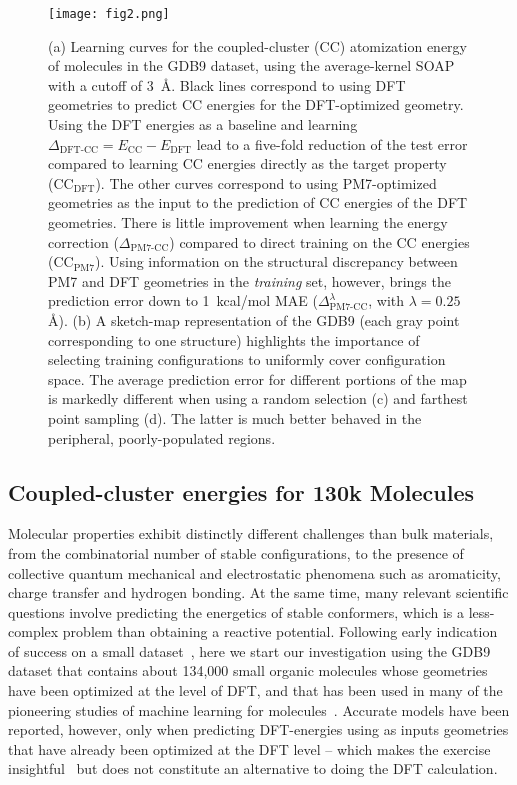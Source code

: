 \documentclass[12pt]{article}
\begin{document}
\begin{figure*}[hbtp]
\centering\texttt{[image: fig2.png]}
\caption{%
(a) Learning curves for the coupled-cluster (CC) atomization energy of molecules in the
GDB9 dataset, using the average-kernel SOAP with a cutoff of 3~\AA{}.
%
%
Black lines correspond to using DFT geometries to predict CC energies for the DFT-optimized geometry.
Using  the DFT energies as a baseline and learning
$\Delta_\text{DFT-CC}=E_\text{CC}-E_\text{DFT}$ lead to a five-fold 
reduction of the test error compared to learning CC energies directly 
as the target property (CC$_\text{DFT}$). 
%
%
%
The other curves correspond to using  PM7-optimized 
geometries as the input to the prediction of CC energies 
of the DFT geometries. There is little improvement when 
learning the energy correction ($\Delta_\text{PM7-CC}$) 
compared to direct training on the CC energies (CC$_\text{PM7}$). 
Using information on the structural 
discrepancy between PM7 and DFT geometries in the \emph{training} set, 
however, brings the prediction error down to 1~kcal/mol MAE ($\Delta^\lambda_\text{PM7-CC}$, with $\lambda=0.25$\AA).
%
%
(b) A sketch-map representation of the GDB9 (each gray point corresponding to one structure) highlights the importance of 
selecting training configurations to uniformly cover configuration space. The average prediction error for different portions of the map is markedly different when using a random selection (c) and farthest point sampling (d). The latter is much better behaved in the peripheral, poorly-populated regions. 
}
\label{fig:gdb9}
\end{figure*}


\subsection{Coupled-cluster energies for 130k Molecules }

%
Molecular properties exhibit distinctly different 
challenges than bulk materials, from 
the combinatorial number of stable configurations, 
to the presence of collective quantum mechanical
and electrostatic phenomena such as aromaticity, 
charge transfer and hydrogen bonding. At the 
same time, many relevant scientific questions 
involve predicting the energetics of stable
conformers, which is a less-complex problem than
obtaining a reactive potential.
Following early indication of success on a small 
dataset~\cite{mont+13njp,de+16pccp},
here we start our investigation using the GDB9 dataset
that contains about 134,000 small organic molecules 
%
whose geometries have been optimized at the level
of DFT, and that 
has been used in many of the 
pioneering studies of machine learning
for molecules~\cite{rama+14sd,rama+15jctc}. Accurate
models have been reported, however, only when
predicting DFT-energies using as inputs geometries
that have already been optimized at the DFT level
 --
which makes the exercise
insightful~\cite{schu+17ncomm} but does not constitute an alternative to doing the DFT calculation.  %
\end{document}
